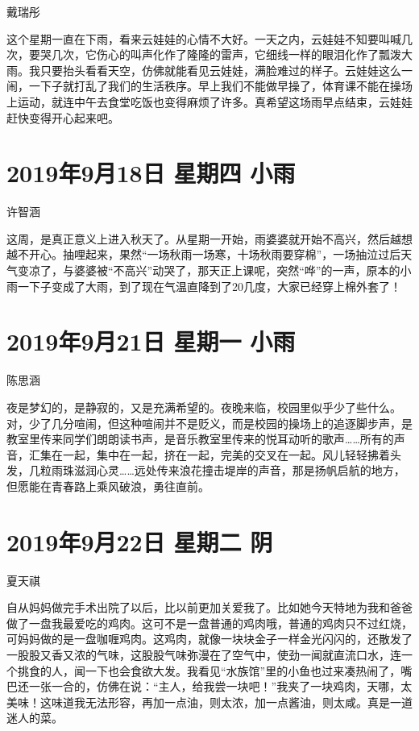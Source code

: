 戴瑞彤

这个星期一直在下雨，看来云娃娃的心情不大好。一天之内，云娃娃不知要叫喊几次，要哭几次，它伤心的叫声化作了隆隆的雷声，它细线一样的眼泪化作了瓢泼大雨。我只要抬头看看天空，仿佛就能看见云娃娃，满脸难过的样子。云娃娃这么一闹，一下子就打乱了我们的生活秩序。早上我们不能做早操了，体育课不能在操场上运动，就连中午去食堂吃饭也变得麻烦了许多。真希望这场雨早点结束，云娃娃赶快变得开心起来吧。

\section{2019年9月18日 星期四 小雨}

许智涵

这周，是真正意义上进入秋天了。从星期一开始，雨婆婆就开始不高兴，然后越想越不开心。抽哩起来，果然``一场秋雨一场寒，十场秋雨要穿棉''，一场抽泣过后天气变凉了，与婆婆被``不高兴''动哭了，那天正上课呢，突然``哗''的一声，原本的小雨一下子变成了大雨，到了现在气温直降到了20几度，大家已经穿上棉外套了！

\section{2019年9月21日 星期一 小雨}

陈思涵

夜是梦幻的，是静寂的，又是充满希望的。夜晚来临，校园里似乎少了些什么。对，少了几分喧闹，但这种喧闹并不是贬义，而是校园的操场上的追逐脚步声，是教室里传来同学们朗朗读书声，是音乐教室里传来的悦耳动听的歌声\ldots\ldots 所有的声音，汇集在一起，集中在一起，挤在一起，完美的交叉在一起。风儿轻轻拂着头发，几粒雨珠滋润心灵\ldots\ldots 远处传来浪花撞击堤岸的声音，那是扬帆启航的地方，但愿能在青春路上乘风破浪，勇往直前。

\section{2019年9月22日 星期二 阴}

夏天祺

自从妈妈做完手术出院了以后，比以前更加关爱我了。比如她今天特地为我和爸爸做了一盘我最爱吃的鸡肉。这可不是一盘普通的鸡肉哦，普通的鸡肉只不过红烧，可妈妈做的是一盘咖喱鸡肉。这鸡肉，就像一块块金子一样金光闪闪的，还散发了一股股又香又浓的气味，这股股气味弥漫在了空气中，使劲一闻就直流口水，连一个挑食的人，闻一下也会食欲大发。我看见``水族馆''里的小鱼也过来凑热闹了，嘴巴还一张一合的，仿佛在说：``主人，给我尝一块吧！''我夹了一块鸡肉，天哪，太美味！这味道我无法形容，再加一点油，则太浓，加一点酱油，则太咸。真是一道迷人的菜。

